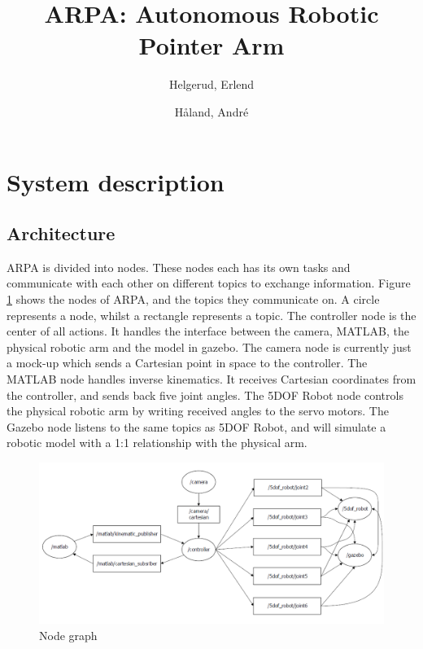 \documentclass[11pt,a4paper]{report}
\title{ARPA: Autonomous Robotic Pointer Arm}
\author{Helgerud, Erlend \and Håland, André}
\begin{document}
	\maketitle
	\tableofcontents
	\newpage

	\section{System description}
	
	\subsection{Architecture}
	ARPA is divided into nodes. These nodes each has its own tasks and communicate with each other on different topics to exchange information. Figure \ref{fig:nodegraph} shows the nodes of ARPA, and the topics they communicate on. A circle represents a node, whilst a rectangle represents a topic. The controller node is the center of all actions. It handles the interface between the camera, MATLAB, the physical robotic arm and the model in gazebo. The camera node is currently just a mock-up which sends a Cartesian point in space to the controller. The MATLAB node handles inverse kinematics. It receives Cartesian coordinates from the controller, and sends back five joint angles. The 5DOF Robot node controls the physical robotic arm by writing received angles to the servo motors. The Gazebo node listens to the same topics as 5DOF Robot, and will simulate a robotic model with a 1:1 relationship with the physical arm.
	
	\begin{figure}[ht]
		\includegraphics[width=\linewidth]{../Diagrams/NodeGraph.png}
		\caption{Node graph}
		\label{fig:nodegraph}
	\end{figure}
	
\end{document}
